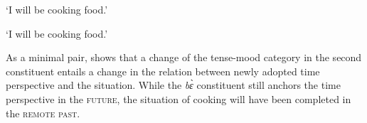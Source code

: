 \clearpage

    \trans `I will be cooking food.'
\z


    \trans `I will be cooking food.'
\z

As a minimal pair,  shows that a change of the tense-mood category in the second constituent entails a change in the relation between newly adopted time perspective and the situation. While the {\itshape bɛ̀} constituent still anchors the time perspective in the \textsc{future}, the situation of cooking will have been completed in the \textsc{remote past}.

\z
